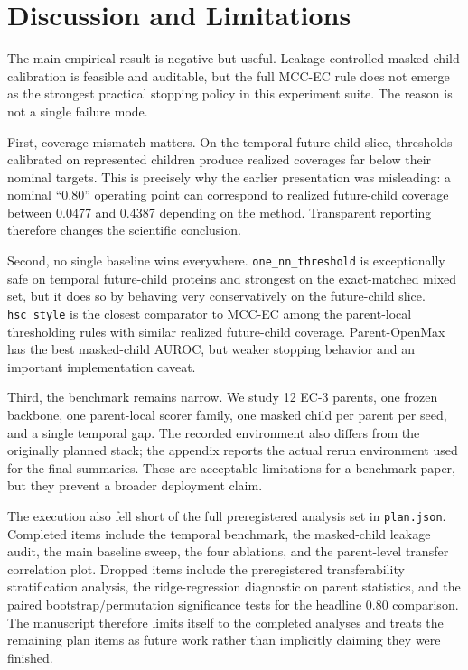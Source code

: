 \documentclass{article}
\newcommand{\method}{MCC-EC\xspace}
\begin{document}
\section{Discussion and Limitations}
\label{sec:discussion}

The main empirical result is negative but useful. Leakage-controlled masked-child calibration is feasible and auditable, but the full \method rule does not emerge as the strongest practical stopping policy in this experiment suite. The reason is not a single failure mode.

First, coverage mismatch matters. On the temporal future-child slice, thresholds calibrated on represented children produce realized coverages far below their nominal targets. This is precisely why the earlier presentation was misleading: a nominal ``0.80'' operating point can correspond to realized future-child coverage between 0.0477 and 0.4387 depending on the method. Transparent reporting therefore changes the scientific conclusion.

Second, no single baseline wins everywhere. \texttt{one\_nn\_threshold} is exceptionally safe on temporal future-child proteins and strongest on the exact-matched mixed set, but it does so by behaving very conservatively on the future-child slice. \texttt{hsc\_style} is the closest comparator to \method among the parent-local thresholding rules with similar realized future-child coverage. Parent-OpenMax has the best masked-child AUROC, but weaker stopping behavior and an important implementation caveat.

Third, the benchmark remains narrow. We study 12 EC-3 parents, one frozen backbone, one parent-local scorer family, one masked child per parent per seed, and a single temporal gap. The recorded environment also differs from the originally planned stack; the appendix reports the actual rerun environment used for the final summaries. These are acceptable limitations for a benchmark paper, but they prevent a broader deployment claim.

The execution also fell short of the full preregistered analysis set in \texttt{plan.json}. Completed items include the temporal benchmark, the masked-child leakage audit, the main baseline sweep, the four ablations, and the parent-level transfer correlation plot. Dropped items include the preregistered transferability stratification analysis, the ridge-regression diagnostic on parent statistics, and the paired bootstrap/permutation significance tests for the headline 0.80 comparison. The manuscript therefore limits itself to the completed analyses and treats the remaining plan items as future work rather than implicitly claiming they were finished.
\end{document}
